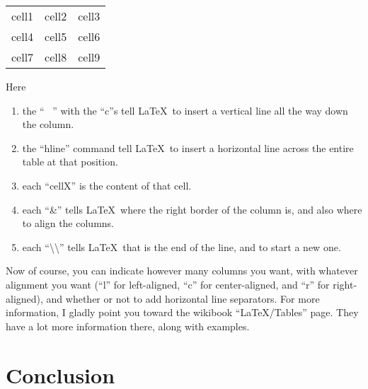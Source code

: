 \documentclass[11pt,letterpaper,twoside,titlepage]{article}
\newcommand{\latex}{\LaTeX \ }
\begin{document}
			\begin{center}
					\begin{tabular}{ |c|c|c| } 
						 \hline
						 cell1 & cell2 & cell3 \\ 
						 cell4 & cell5 & cell6 \\ 
						 cell7 & cell8 & cell9 \\ 
						 \hline
					\end{tabular}
				\end{center}
			
			Here 
			
			\begin{enumerate}
			
				\item 
				
					the `` \vline \ '' with the ``c''s tell \latex to insert a vertical line all the way down the column.
					
				\item 
				
					the ``hline'' command tell \latex to insert a horizontal line across the entire table at that position.
					
				\item 
				
					each ``cellX'' is the content of that cell.
					
				\item
				
					each ``\&'' tells \latex where the right border of the column is, and also where to align the columns.
					
				\item 
				
					each ``\textbackslash \textbackslash'' tells \latex that is the end of the line, and to start a new one.
			
			\end{enumerate}
			
			Now of course, you can indicate however many columns you want, with whatever alignment you want (``l'' for left-aligned, ``c'' for center-aligned, and ``r'' for right-aligned), and whether or not to add horizontal line separators.  For more information, I gladly point you toward the wikibook ``LaTeX/Tables'' page.  They have a lot more information there, along with examples.
			
\newpage
	
	\section*{Conclusion}
	
\end{document}
